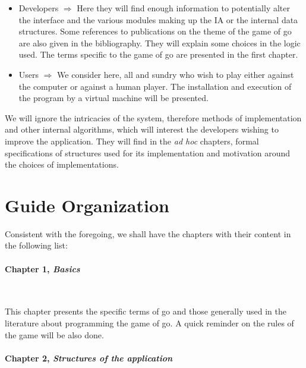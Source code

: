 \documentclass[a4paper,10pt,twoside]{report}
\begin{document}
	\begin{itemize}
	\vspace{4mm}
		\item{Developers $\Rightarrow$  Here they will find enough information to potentially alter the interface and the various modules making up the IA or the internal data structures. Some references to publications on the theme of the game of go are also given in the bibliography. They will explain some choices in the logic used. The terms specific to the game of go are presented in the first chapter.}\\

		\item{Users $\Rightarrow$  We consider here, all and sundry who wish to play either against the computer or against a human player. The installation and execution of the program by a virtual machine will be presented.}
	\end{itemize}
	\vspace{4mm}

    We will ignore the intricacies of the system, therefore methods of implementation and other internal algorithms, which will interest the developers wishing to improve the application. They will find in the \emph{ad hoc} chapters, formal specifications of structures used for its implementation and motivation around the choices of implementations.

\section*{Guide Organization}
\vspace{4mm}

	    Consistent with the foregoing, we shall have the chapters with their content in the following list:\\

    \paragraph{Chapter 1, \emph{Basics}}
	~~\vspace{2mm}
	
	This chapter presents the specific terms of go and those generally used in the literature about programming the game of go. A quick reminder on the rules of the game will be also done.

	\paragraph{Chapter 2, \emph{Structures of the application}}
	~~\vspace{2mm}
	
\end{document}
